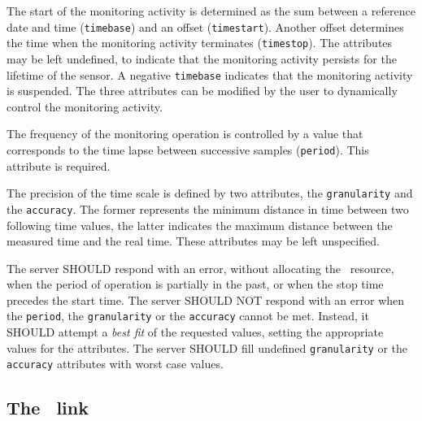 \documentclass[10pt,a4paper]{article}
\begin{document}
The start of the monitoring activity is determined as the sum between a reference date and time ({\tt timebase}) and an offset ({\tt timestart}). Another offset determines the time when the monitoring activity terminates ({\tt timestop}). The attributes may be left undefined, to indicate that the monitoring activity persists for the lifetime of the sensor. A negative {\tt timebase} indicates that the monitoring activity is suspended. The three attributes can be modified by the user to dynamically control the monitoring activity.

The frequency of the monitoring operation is controlled by a value that corresponds to the time lapse between successive samples ({\tt period}). This attribute is required.

The precision of the time scale is defined by two attributes, the {\tt granularity} and the {\tt accuracy}. The former represents the minimum distance in time between two following time values, the latter indicates the maximum distance between the measured time and the real time. These attributes may be left unspecified.

The server SHOULD respond with an error, without allocating the \sens\ resource, when the period of operation is partially in the past, or when the stop time precedes the start time. The server SHOULD NOT respond with an error when the {\tt period}, the {\tt granularity} or the {\tt accuracy} cannot be met. Instead, it SHOULD attempt a {\em best fit} of the requested values, setting the appropriate values for the attributes. The server SHOULD fill undefined {\tt granularity} or the {\tt accuracy} attributes with worst case values. 

\subsection{The \coll\ link \label{sec:collector}}

\end{document}
